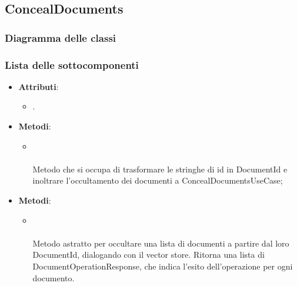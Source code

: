 \documentclass[10pt, a4paper]{article}
\begin{document}
\subsection{ConcealDocuments}
\subsubsection{Diagramma delle classi}
\subsubsection{Lista delle sottocomponenti}

\label{ConcealDocumentsControllerDettaglio}
\begin{itemize}
    \item \textbf{Attributi}:
    \begin{itemize}
        \item {}.
    \end{itemize}
    \item \textbf{Metodi}:
    \begin{itemize}
        \item {}\\ \\
        Metodo che si occupa di trasformare le stringhe di id in DocumentId e inoltrare l'occultamento dei documenti a ConcealDocumentsUseCase;
    \end{itemize}
\end{itemize}


\label{ConcealDocumentsPortDettaglio}
\begin{itemize}
    \item \textbf{Metodi}:
    \begin{itemize}
        \item {}\\ \\
        Metodo astratto per occultare una lista di documenti a partire dal loro DocumentId, dialogando con il vector store. Ritorna una lista di DocumentOperationResponse, che indica l'esito dell'operazione per ogni documento.
    \end{itemize}
\end{itemize}
\end{document}
